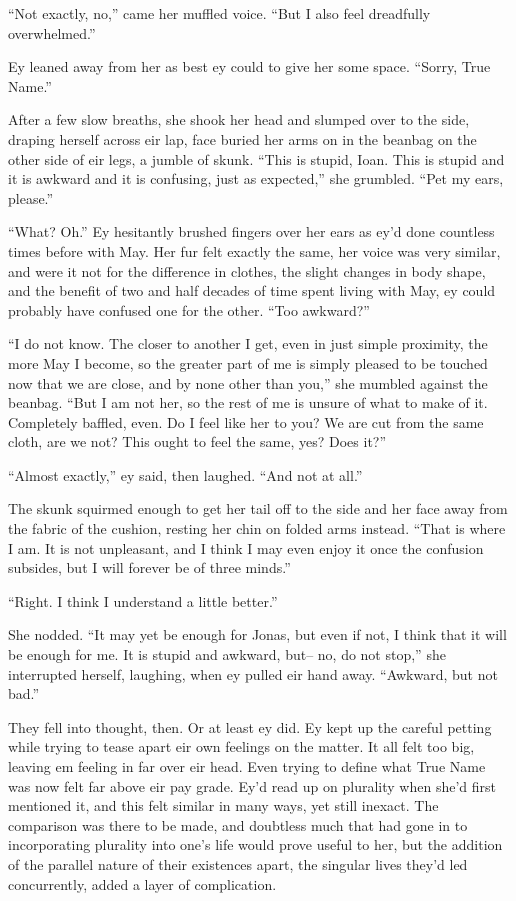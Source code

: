 ``Not exactly, no,'' came her muffled voice. ``But I also feel dreadfully overwhelmed.''

Ey leaned away from her as best ey could to give her some space. ``Sorry, True Name.''

After a few slow breaths, she shook her head and slumped over to the side, draping herself across eir lap, face buried her arms on in the beanbag on the other side of eir legs, a jumble of skunk. ``This is stupid, Ioan. This is stupid and it is awkward and it is confusing, just as expected,'' she grumbled. ``Pet my ears, please.''

``What? Oh.'' Ey hesitantly brushed fingers over her ears as ey'd done countless times before with May. Her fur felt exactly the same, her voice was very similar, and were it not for the difference in clothes, the slight changes in body shape, and the benefit of two and half decades of time spent living with May, ey could probably have confused one for the other. ``Too awkward?''

``I do not know. The closer to another I get, even in just simple proximity, the more May I become, so the greater part of me is simply pleased to be touched now that we are close, and by none other than you,'' she mumbled against the beanbag. ``But I am not her, so the rest of me is unsure of what to make of it. Completely baffled, even. Do I feel like her to you? We are cut from the same cloth, are we not? This ought to feel the same, yes? Does it?''

``Almost exactly,'' ey said, then laughed. ``And not at all.''

The skunk squirmed enough to get her tail off to the side and her face away from the fabric of the cushion, resting her chin on folded arms instead. ``That is where I am. It is not unpleasant, and I think I may even enjoy it once the confusion subsides, but I will forever be of three minds.''

``Right. I think I understand a little better.''

She nodded. ``It may yet be enough for Jonas, but even if not, I think that it will be enough for me. It is stupid and awkward, but-- no, do not stop,'' she interrupted herself, laughing, when ey pulled eir hand away. ``Awkward, but not bad.''

They fell into thought, then. Or at least ey did. Ey kept up the careful petting while trying to tease apart eir own feelings on the matter. It all felt too big, leaving em feeling in far over eir head. Even trying to define what True Name was now felt far above eir pay grade. Ey'd read up on plurality when she'd first mentioned it, and this felt similar in many ways, yet still inexact. The comparison was there to be made, and doubtless much that had gone in to incorporating plurality into one's life would prove useful to her, but the addition of the parallel nature of their existences apart, the singular lives they'd led concurrently, added a layer of complication.

